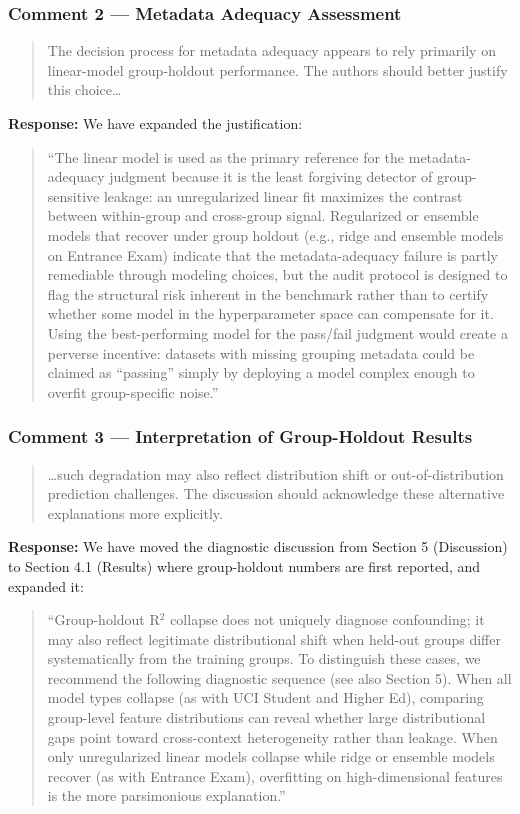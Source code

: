 \documentclass[12pt,a4paper]{article}
\begin{document}
\subsubsection*{Comment 2 --- Metadata Adequacy Assessment}

\begin{quote}
The decision process for metadata adequacy appears to rely primarily on linear-model group-holdout performance. The authors should better justify this choice\ldots
\end{quote}

\textbf{Response:} We have expanded the justification:

\begin{quote}
``The linear model is used as the primary reference for the metadata-adequacy judgment because it is the least forgiving detector of group-sensitive leakage: an unregularized linear fit maximizes the contrast between within-group and cross-group signal. Regularized or ensemble models that recover under group holdout (e.g., ridge and ensemble models on Entrance Exam) indicate that the metadata-adequacy failure is partly remediable through modeling choices, but the audit protocol is designed to flag the structural risk inherent in the benchmark rather than to certify whether some model in the hyperparameter space can compensate for it. Using the best-performing model for the pass/fail judgment would create a perverse incentive: datasets with missing grouping metadata could be claimed as ``passing'' simply by deploying a model complex enough to overfit group-specific noise.''
\end{quote}

\subsubsection*{Comment 3 --- Interpretation of Group-Holdout Results}

\begin{quote}
\ldots such degradation may also reflect distribution shift or out-of-distribution prediction challenges. The discussion should acknowledge these alternative explanations more explicitly.
\end{quote}

\textbf{Response:} We have moved the diagnostic discussion from Section 5 (Discussion) to Section 4.1 (Results) where group-holdout numbers are first reported, and expanded it:

\begin{quote}
``Group-holdout R$^2$ collapse does not uniquely diagnose confounding; it may also reflect legitimate distributional shift when held-out groups differ systematically from the training groups. To distinguish these cases, we recommend the following diagnostic sequence (see also Section 5). When all model types collapse (as with UCI Student and Higher Ed), comparing group-level feature distributions can reveal whether large distributional gaps point toward cross-context heterogeneity rather than leakage. When only unregularized linear models collapse while ridge or ensemble models recover (as with Entrance Exam), overfitting on high-dimensional features is the more parsimonious explanation.''
\end{quote}
\end{document}
